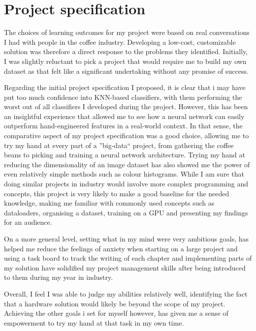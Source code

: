 \documentclass[12pt]{article}
\begin{document}
    \thispagestyle{fancy}


    \section{Project specification}
    \label{sec:section-1}
    The choices of learning outcomes for my project were based on real conversations I had with people in the coffee industry.
    Developing a low-cost, customizable solution was therefore a direct response to the problems they identified.
    Initially, I was slightly reluctant to pick a project that would require me to build my own dataset as that felt like a significant
    undertaking without any promise of success.

    Regarding the initial project specification I proposed, it is clear that i may have put too much confidence into KNN-based classifiers,
    with them performing the worst out of all classifiers I developed during the project.
    However, this has been an insightful experience that allowed me to see how a neural network can easily outperform hand-engineered features
    in a real-world context.
    In that sense, the comparative aspect of my project specification was a good choice, allowing me to try my hand at every part
    of a ''big-data`` project, from gathering the coffee beans to picking and training a neural network architecture.
    Trying my hand at reducing the dimensionality of an image dataset has also showed me the power of even relatively simple methods such as colour histograms.
    While I am sure that doing similar projects in industry would involve more complex programming and concepts, this project is very likely
    to make a good baseline for the needed knowledge, making me familiar with commonly used concepts such as dataloaders, organising a dataset,
    training on a GPU and presenting my findings for an audience.

    On a more general level, setting what in my mind were very ambitious goals, has helped me reduce the feelings of anxiety when starting on a large project
    and using a task board to track the writing of each chapter and implementing parts of my solution have solidified my project management skills after being introduced to them
    during my year in industry.

    Overall, I feel I was able to judge my abilities relatively well, identifying the fact that a hardware solution would likely be beyond
    the scope of my project.
    Achieving the other goals i set for myself however, has given me a sense of empowerment to try my hand at that task in my own time.
\end{document}

